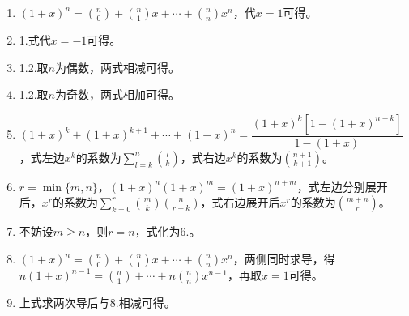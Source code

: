 \sol{} \begin{enumerate}
	\item $\displaystyle(1+x)^n=\binom{n}{0}+\binom{n}{1}x+\cdots +\binom{n}{n}x^n$，代$x=1$可得。
	\item 1.式代$x=-1$可得。
	\item 1.2.取$n$为偶数，两式相减可得。
	\item 1.2.取$n$为奇数，两式相加可得。
	\item $\displaystyle(1+x)^k+(1+x)^{k+1}+\cdots+(1+x)^n=\dfrac{(1+x)^k[1-(1+x)^{n-k}]}{1-(1+x)}$，式左边$x^k$的系数为$\displaystyle \sum_{l=k}^n\binom{l}{k}$，式右边$x^k$的系数为$\displaystyle\binom{n+1}{k+1}$。
	\item $r=\min\{m,n\}$，$(1+x)^n(1+x)^m=(1+x)^{n+m}$，式左边分别展开后，$x^{r}$的系数为$\displaystyle\sum_{k=0}^r\binom{m}{k}\binom{n}{r-k}$，式右边展开后$x^r$的系数为$\displaystyle\binom{m+n}{r}$。
	\item 不妨设$m\geqslant n$，则$r=n$，式化为6.。
	\item $\displaystyle (1+x)^n=\binom{n}{0}+\binom{n}{1}x+\cdots +\binom{n}{n}x^n$，两侧同时求导，得$\displaystyle n(1+x)^{n-1}=\binom{n}{1}+\cdots +n\binom{n}{n}x^{n-1}$，再取$x=1$可得。
	\item 上式求两次导后与8.相减可得。
\end{enumerate}
\par\hfill{}\easy


